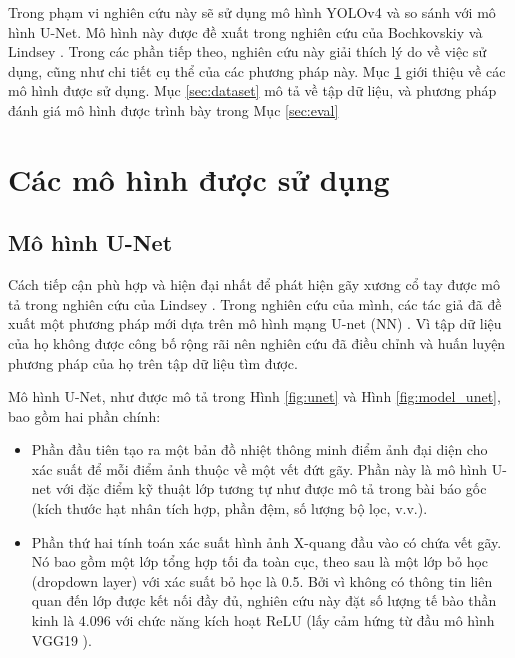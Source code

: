 \documentclass[../the.tex]{subfiles}
\begin{document}
Trong phạm vi nghiên cứu này sẽ sử dụng mô hình YOLOv4 và so sánh với mô hình U-Net. Mô hình này được đề xuất trong nghiên cứu của Bochkovskiy \etal \cite{Bochkovskiy2020YOLOv4OS} và Lindsey \etal \cite{Lindsey1806905115}. Trong các phần tiếp theo, nghiên cứu này giải thích lý do về việc sử dụng, cũng như chi tiết cụ thể của các phương pháp này. Mục \ref{sec:model} giới thiệu về các mô hình được sử dụng. Mục \ref{sec:dataset} mô tả về tập dữ liệu, và phương pháp đánh giá mô hình được trình bày trong Mục \ref{sec:eval}


\section{Các mô hình được sử dụng}
\label{sec:model}

\subsection{Mô hình U-Net}

{\fontsize{13}{12} \selectfont
Cách tiếp cận phù hợp và hiện đại nhất để phát hiện gãy xương cổ tay được mô tả trong nghiên cứu của Lindsey \etal \cite{Lindsey1806905115}. Trong nghiên cứu của mình, các tác giả đã đề xuất một phương pháp mới dựa trên mô hình mạng U-net (NN) \cite{Ronneberger2015UNetCN,FridAdar2018ImprovingTS,BOUSLAMA2020100306,Liu2022}. Vì tập dữ liệu của họ không được công bố rộng rãi nên nghiên cứu đã điều chỉnh và huấn luyện phương pháp của họ trên tập dữ liệu tìm được.

Mô hình U-Net, như được mô tả trong Hình \ref{fig:unet} và Hình \ref{fig:model_unet}, bao gồm hai phần chính:

\begin{itemize}
  \item Phần đầu tiên tạo ra một bản đồ nhiệt thông minh điểm ảnh đại diện cho xác suất để mỗi điểm ảnh thuộc về một vết đứt gãy. Phần này là mô hình U-net với đặc điểm kỹ thuật lớp tương tự như được mô tả trong bài báo gốc (kích thước hạt nhân tích hợp, phần đệm, số lượng bộ lọc, v.v.).
  
  \item Phần thứ hai tính toán xác suất hình ảnh X-quang đầu vào có chứa vết gãy. Nó bao gồm một lớp tổng hợp tối đa toàn cục, theo sau là một lớp bỏ học (dropdown layer) với xác suất bỏ học là 0.5. Bởi vì không có thông tin liên quan đến lớp được kết nối đầy đủ, nghiên cứu này đặt số lượng tế bào thần kinh là 4.096 với chức năng kích hoạt ReLU (lấy cảm hứng từ đầu mô hình VGG19 \cite{2014arXiv1409.1556S}).
 
\end{itemize}

}
\end{document}
